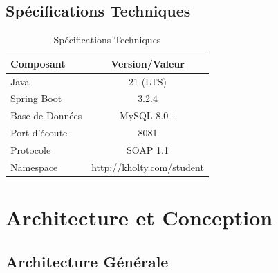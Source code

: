 \documentclass[12pt,a4paper]{report}
\begin{document}
\section{Spécifications Techniques}
\begin{table}[h]
\centering
\begin{tabular}{|l|c|}
\hline
\textbf{Composant} & \textbf{Version/Valeur} \\
\hline
Java & 21 (LTS) \\
Spring Boot & 3.2.4 \\
Base de Données & MySQL 8.0+ \\
Port d'écoute & 8081 \\
Protocole & SOAP 1.1 \\
Namespace & http://kholty.com/student \\
\hline
\end{tabular}
\caption{Spécifications Techniques}
\end{table}

\newpage

\chapter{Architecture et Conception}

\section{Architecture Générale}
\end{document}

